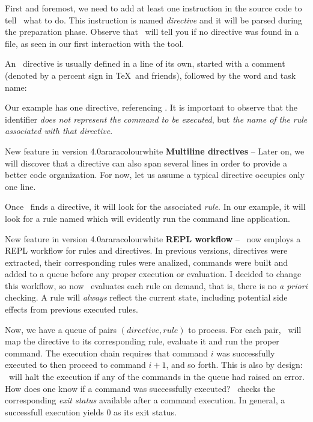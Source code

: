 First and foremost, we need to add at least one instruction in the source code to tell \arara\ what to do. This instruction is named \emph{directive} and it will be parsed during the preparation phase. Observe that \arara\ will tell you if no directive was found in a file, as seen in our first interaction with the tool.

An \arara\ directive is usually defined in a line of its own, started with a comment (denoted by a percent sign in \TeX\ and friends), followed by the word  and task name:


Our example has one directive, referencing . It is important to observe that the  identifier \emph{does not represent the command to be executed}, but \emph{the name of the rule associated with that directive}.

\begin{messagebox}{New feature in version 4.0}{araracolour}{\icinfo}{white}
\textbf{Multiline directives} -- Later on, we will discover that a directive can also span several lines in order to provide a better code organization. For now, let us assume a typical directive occupies only one line.
\end{messagebox}

Once \arara\ finds a directive, it will look for the associated \emph{rule}. In our example, it will look for a rule named  which will evidently run the  command line application.

\begin{messagebox}{New feature in version 4.0}{araracolour}{\icattention}{white}
\textbf{REPL workflow} -- \arara\ now employs a REPL workflow for rules and directives. In previous versions, directives were extracted, their corresponding rules were analized, commands were built and added to a queue before any proper execution or evaluation. I decided to change this workflow, so now \arara\ evaluates each rule on demand, that is, there is no \emph{a priori} checking. A rule will \emph{always} reflect the current state, including potential side effects from previous executed rules. 
\end{messagebox}

Now, we have a queue of pairs $(\textit{directive}, \textit{rule})$ to process. For each pair, \arara\ will map the directive to its corresponding rule, evaluate it and run the proper command. The execution chain requires that command $i$ was successfully executed to then proceed to command $i+1$, and so forth. This is also by design: \arara\ will halt the execution if any of the commands in the queue had raised an error. How does one know if a command was successfully executed? \arara\ checks the corresponding \emph{exit status} available after a command execution. In general, a successfull execution yields 0 as its exit status.

